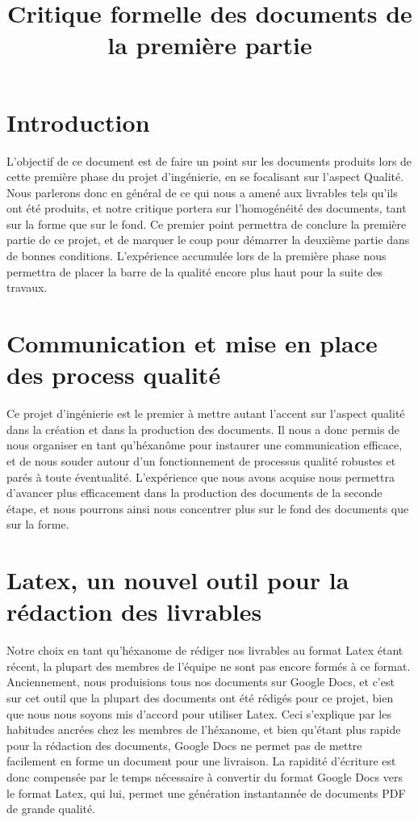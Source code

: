 \documentclass[a4paper]{article}
\begin{document}
\title{Critique formelle des documents de la première partie}
\maketitle

\section{Introduction}

L'objectif de ce document est de faire un point sur les documents produits lors de cette première phase du projet d'ingénierie, en se focalisant sur l'aspect Qualité. Nous parlerons donc en général de ce qui nous a amené aux livrables tels qu'ils ont été produits, et notre critique portera sur l'homogénéité des documents, tant sur la forme que sur le fond. Ce premier point permettra de conclure la première partie de ce projet, et de marquer le coup pour démarrer la deuxième partie dans de bonnes conditions. L'expérience accumulée lors de la première phase nous permettra de placer la barre de la qualité encore plus haut pour la suite des travaux.

\section{Communication et mise en place des process qualité}

Ce projet d'ingénierie est le premier à mettre autant l'accent sur l'aspect qualité dans la création et dans la production des documents. Il nous a donc permis de nous organiser en tant qu'héxanôme pour instaurer une communication efficace, et de nous souder autour d'un fonctionnement de processus qualité robustes et parés à toute éventualité. L'expérience que nous avons acquise nous permettra d'avancer plus efficacement dans la production des documents de la seconde étape, et nous pourrons ainsi nous concentrer plus sur le fond des documents que sur la forme.

\section{Latex, un nouvel outil pour la rédaction des livrables}

Notre choix en tant qu'héxanome de rédiger nos livrables au format Latex étant récent, la plupart des membres de l'équipe ne sont pas encore formés à ce format. Anciennement, nous produisions tous nos documents sur Google Docs, et c'est sur cet outil que la plupart des documents ont été rédigés pour ce projet, bien que nous nous soyons mis d'accord pour utiliser Latex. Ceci s'explique par les habitudes ancrées chez les membres de l'héxanome, et bien qu'étant plus rapide pour la rédaction des documents, Google Docs ne permet pas de mettre facilement en forme un document pour une livraison. La rapidité d'écriture est donc compensée par le temps nécessaire à convertir du format Google Docs vers le format Latex, qui lui, permet une génération instantannée de documents PDF de grande qualité.
\end{document}
